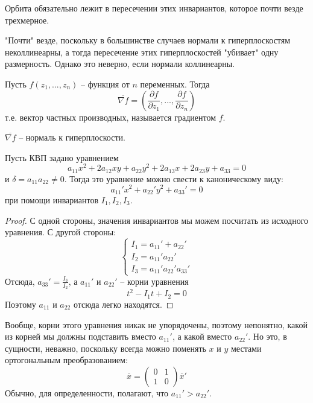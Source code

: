 \begin{Rem}
	Орбита обязательно лежит в пересечении этих инвариантов, которое почти везде трехмерное.
\end{Rem}

\begin{Rem}
	"Почти" везде, поскольку в большинстве случаев нормали к гиперплоскостям неколлинеарны, а тогда пересечение этих гиперплоскостей "убивает" одну размерность.
	Однако это неверно, если нормали коллинеарны.
\end{Rem}

\begin{Def}
	Пусть $f(z_1, ..., z_n)$ -- функция от $n$ переменных. Тогда 
	\[\overline{\nabla f} = \left( \frac{\partial f}{\partial z_1}, ..., \frac{\partial f}{\partial z_n}\right)\] 
	т.е. вектор частных производных, называется градиентом $f$.
\end{Def}

\begin{Prop}
	$\overline{\nabla f}$ -- нормаль к гиперплоскости.
\end{Prop}

\begin{Thm}
	Пусть КВП задано уравнением
	\[a_{11} x^2 + 2a_{12}xy + a_{22}y^2 + 2a_{13}x + 2a_{23}y + a_{33} = 0\]
	и $\delta = a_{11} a_{22} \neq 0$. Тогда это уравнение можно свести к каноническому виду:
	\[a_{11}' x^2 + a_{22}'y^2 + a_{33}' = 0\]	
	при помощи инвариантов $I_1, I_2, I_3$.
\end{Thm}

\begin{proof}
	С одной стороны, значения инвариантов мы можем посчитать из исходного уравнения. С другой стороны:
	\[\begin{cases}
		I_1 = a_{11}' + a_{22}' \\
		I_2 = a_{11}' a_{22}' \\
		I_3 = a_{11}' a_{22}' a_{33}'
	\end{cases}\]
	Отсюда, $a_{33}' = \frac{I_3}{I_2}$, а $a_{11}'$ и $a_{22}'$ -- корни уравнения
	\[t^2 - I_1 t + I_2 = 0\]
	Поэтому $a_{11}$ и $a_{22}$ отсюда легко находятся. 
\end{proof}

\begin{Rem}
	Вообще, корни этого уравнения никак не упорядочены, поэтому непонятно, какой из корней мы должны подставить вместо $a_{11}'$, а какой вместо $a_{22}'$.
	Но это, в сущности, неважно, поскольку всегда можно поменять $x$ и $y$ местами ортогональным преобразованием:
	\[\overline{x} = \left(\begin{array}{cc}
	0 & 1 \\ 
	1 & 0
	\end{array}\right) \overline{x}'\]
	Обычно, для определенности, полагают, что $a_{11}' > a_{22}'$.
\end{Rem}

